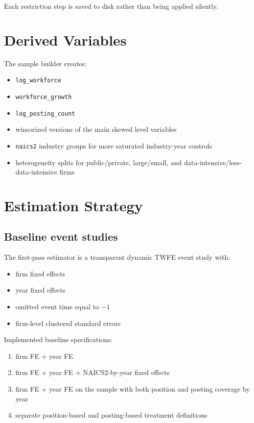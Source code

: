 \documentclass[11pt]{article}
\begin{document}
Each restriction step is saved to disk rather than being applied silently.

\section{Derived Variables}

The sample builder creates:

\begin{itemize}[leftmargin=1.5em]
    \item \texttt{log\_workforce}
    \item \texttt{workforce\_growth}
    \item \texttt{log\_posting\_count}
    \item winsorized versions of the main skewed level variables
    \item \texttt{naics2} industry groups for more saturated industry-year controls
    \item heterogeneity splits for public/private, large/small, and data-intensive/less-data-intensive firms
\end{itemize}

\section{Estimation Strategy}

\subsection*{Baseline event studies}

The first-pass estimator is a transparent dynamic TWFE event study with:

\begin{itemize}[leftmargin=1.5em]
    \item firm fixed effects
    \item year fixed effects
    \item omitted event time equal to $-1$
    \item firm-level clustered standard errors
\end{itemize}

Implemented baseline specifications:

\begin{enumerate}[leftmargin=1.5em]
    \item firm FE + year FE
    \item firm FE + year FE + NAICS2-by-year fixed effects
    \item firm FE + year FE on the sample with both position and posting coverage by year
    \item separate position-based and posting-based treatment definitions
\end{enumerate}
\end{document}
